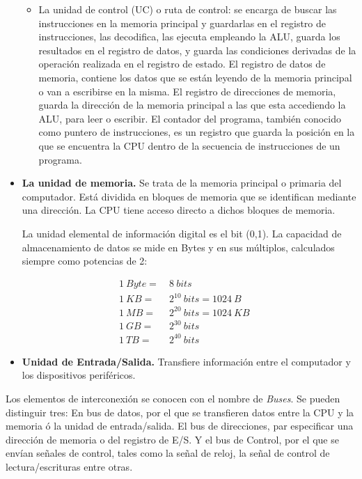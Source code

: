 \begin{paracol}{2}
\begin{itemize}
\begin{itemize}
\item La unidad de control (UC) o ruta de control: se encarga de buscar las instrucciones en la memoria principal y guardarlas en el registro de instrucciones, las decodifica, las ejecuta empleando la ALU, guarda los resultados en el registro de datos, y guarda las condiciones derivadas de la operación realizada en el registro de estado.  El registro de datos de memoria, contiene los datos que se están leyendo de la memoria principal o van a escribirse en la misma. El registro de direcciones de memoria, guarda la dirección de la memoria principal a las que esta accediendo la ALU, para leer o escribir. El contador del programa, también conocido como puntero de instrucciones, es un registro que guarda la posición en la que se encuentra la CPU dentro de la secuencia de instrucciones de un programa.
\end{itemize}
 

\item \textbf{La unidad de memoria.} Se trata de la memoria principal o primaria del computador.  Está dividida en bloques de memoria que se identifican mediante una dirección. La CPU tiene acceso directo a dichos bloques de memoria.

La unidad elemental de información digital es el bit  (0,1). La capacidad de almacenamiento de datos se mide en Bytes  y en sus múltiplos, calculados siempre como potencias de 2:

\begin{align} \nonumber
1\  Byte = &\ 8\ bits\ &\  \\ \nonumber
1\  KB  = &\ 2^{10}\ bits=1024\ B&\ \\  \nonumber
1\  MB = &\ 2^{20}\ bits=1024\ KB&\ \\  \nonumber
1\  GB = &\ 2^{30}\ bits &\ \\  \nonumber
1\  TB  = &\ 2^{40}\ bits\ &\
\end{align} 

\item \textbf{Unidad de Entrada/Salida.} Transfiere información entre el computador y los dispositivos periféricos.
\end{itemize}

Los elementos de interconexión se conocen con el nombre de \emph{Buses}. Se pueden distinguir tres: En bus de datos, por el que se transfieren datos entre la CPU y la memoria ó la unidad de entrada/salida. El bus de direcciones, par especificar una dirección de memoria o del registro de E/S. Y el bus de Control, por el que se envían señales de control, tales como la señal de reloj, la señal de control de lectura/escrituras entre otras.


\end{paracol}
